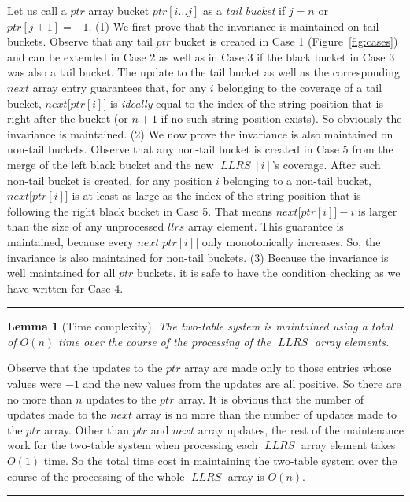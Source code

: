\documentclass[preprint]{elsarticle}
\newtheorem{lemma}{Lemma}[section]
\newcommand{\qedsymb}{\hfill{\rule{2mm}{2mm}}}
\newenvironment{proofsketch}{\begin{trivlist}
\item[\hspace{\labelsep}{\noindent Proof Sketch: }]
}{\qedsymb\end{trivlist}}
\DeclareMathOperator{\llrs}{\mathit{LLRS}}
\begin{document}
\begin{proofsketch}
  Let us call a $ptr$ array bucket $ptr[i\ldots j]$ as a \emph{tail
    bucket} if $j=n$ or $ptr[j+1] = -1$.  (1) We first prove that the
  invariance is maintained on tail buckets.  Observe that any tail
  $ptr$ bucket is created in Case 1 (Figure~\ref{fig:cases}) and can
  be extended in Case 2 as well as in Case 3 if the black bucket in
  Case 3 was also a tail bucket.  The update to the tail bucket as
  well as the corresponding $next$ array entry guarantees that, for
  any $i$ belonging to the coverage of a tail bucket,
  $next\bigl[ptr[i]\bigr]$ is \emph{ideally} equal to the index of the
  string position that is right after the bucket (or $n+1$ if no such
  string position exists). So obviously the invariance is maintained.
  (2) We now prove the invariance is also maintained on non-tail
  buckets.  Observe that any non-tail bucket is created in Case 5 from
  the merge of the left black bucket and the new $\llrs[i]$'s
  coverage. After such non-tail bucket is created, for any position
  $i$ belonging to a non-tail bucket, $next\bigl[ptr[i]\bigr]$ is at
  least as large as the index of the string position that is following
  the right black bucket in Case 5. That means $next\bigl[ptr[i]\bigr]
  - i$ is larger than the size of any unprocessed $llrs$ array
  element. This guarantee is maintained, because every
  $next\bigl[ptr[i]\bigr]$ only monotonically increases.  So, the
  invariance is also maintained for non-tail buckets. (3) Because the
  invariance is well maintained for all $ptr$ buckets, it is safe to
  have the condition checking as we have written for Case 4.
\end{proofsketch}






\begin{lemma}[Time complexity]
\label{lem:table-time}
  The two-table system is maintained using a total of $O(n)$ time
  over the course of the processing of the $\llrs$ array elements. 
\end{lemma}


\begin{proofsketch}
  Observe that the updates to the $ptr$ array are made only to those
  entries whose values were $-1$ and the new values from the updates
  are all positive. So there are no more than $n$ updates
  to the $ptr$ array. It is obvious that the number of updates made to
  the $next$ array is no more than the number of updates made to the
  $ptr$ array. Other than $ptr$ and $next$ array updates, the rest of
  the maintenance work for the two-table system when processing each
  $\llrs$ array element takes $O(1)$ time.  So the total time cost
  in maintaining the two-table system over the course of the
  processing of the whole $\llrs$ array is $O(n)$.
\end{proofsketch}
\end{document}
